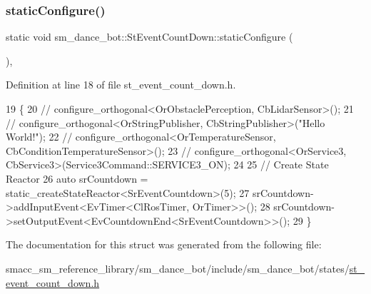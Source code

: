\subsubsection{\texorpdfstring{static\+Configure()}{staticConfigure()}}
{\footnotesize\ttfamily static void sm\+\_\+dance\+\_\+bot\+::\+St\+Event\+Count\+Down\+::static\+Configure (\begin{DoxyParamCaption}{ }\end{DoxyParamCaption})\hspace{0.3cm}{\ttfamily [inline]}, {\ttfamily [static]}}



Definition at line 18 of file st\+\_\+event\+\_\+count\+\_\+down.\+h.


\begin{DoxyCode}
19     \{
20         \textcolor{comment}{//   configure\_orthogonal<OrObstaclePerception, CbLidarSensor>();}
21         \textcolor{comment}{//   configure\_orthogonal<OrStringPublisher, CbStringPublisher>("Hello World!");}
22         \textcolor{comment}{//   configure\_orthogonal<OrTemperatureSensor, CbConditionTemperatureSensor>();}
23         \textcolor{comment}{//   configure\_orthogonal<OrService3, CbService3>(Service3Command::SERVICE3\_ON);      }
24         
25         \textcolor{comment}{// Create State Reactor}
26         \textcolor{keyword}{auto} srCountdown = static\_createStateReactor<SrEventCountdown>(5);        
27         srCountdown->addInputEvent<EvTimer<ClRosTimer, OrTimer>>();
28         srCountdown->setOutputEvent<EvCountdownEnd<SrEventCountdown>>();
29     \}
\end{DoxyCode}


The documentation for this struct was generated from the following file\+:\begin{DoxyCompactItemize}
\item 
smacc\+\_\+sm\+\_\+reference\+\_\+library/sm\+\_\+dance\+\_\+bot/include/sm\+\_\+dance\+\_\+bot/states/\hyperlink{include_2sm__dance__bot_2states_2st__event__count__down_8h}{st\+\_\+event\+\_\+count\+\_\+down.\+h}\end{DoxyCompactItemize}
